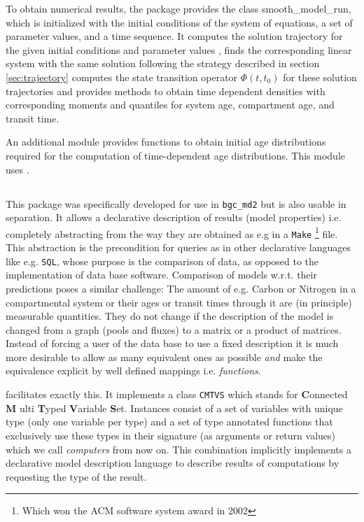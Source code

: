 To obtain numerical results, the package
provides the class smooth\_model\_run, which is initialized with the initial
conditions of the system of equations, a set of parameter values, and a time
sequence. It computes the solution trajectory for the given initial conditions and
parameter values , finds the corresponding linear system with the same solution
following the strategy described in section \ref{sec:trajectory} computes the
state transition operator $\Phi(t, t_0)$ for these solution trajectories and 
provides methods to obtain time dependent densities with corresponding moments and quantiles for system age, compartment age, and transit time. 

An additional module provides functions to obtain initial age distributions
required for the computation of time-dependent age distributions. 
This module uses \LAPM{}.

\subsection{\ComputabilityGraphs{}}
This package was specifically developed for use in \texttt{bgc\_md2} but is also usable in separation.
It allows a declarative description of results (model properties) i.e. completely abstracting from the way they are obtained as e.g in a \texttt{Make} 
\footnote{Which won the ACM software system award in 2002} file.  This
abstraction is the precondition for queries as in other declarative languages
like e.g. \texttt{SQL}, whose purpose is the comparison of data, as opposed to
the implementation of data base software.  Comparison of models w.r.t. their
predictions poses a similar challenge: The amount of e.g. Carbon or Nitrogen in
a compartmental system or their ages or transit times through it are (in
principle) measurable quantities. They do not change if the description of the
model is changed from a graph (pools and fluxes) to a matrix or a product of matrices.
Instead of forcing a user of the data base to use a fixed
description it is much more desirable to allow as many equivalent ones as
possible \emph{and} make the equivalence explicit by  well defined mappings i.e. \emph{functions}.

\ComputabilityGraphs{} facilitates exactly this.
It implements a class \texttt{CMTVS} which stands for 
{\bf C}onnected {\bf M} ulti {\bf T}yped {\bf V}ariable {\bf S}et. 
Instances consist of a set of variables with unique type (only one variable per type) and a set of type annotated functions that exclusively 
use these types in their signature (as arguments or return values) which we call \emph{computers} from now on.
This combination implicitly implements a declarative model description language to describe results of computations by requesting the type of the result. 

